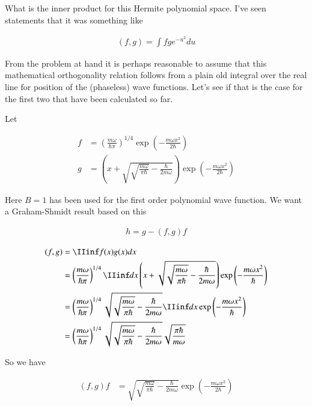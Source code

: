 What is the inner product for this Hermite polynomial space.  I've seen statements that it was something like

\begin{align*}
(f,g) = \int f g e^{-u^2} du
\end{align*}

From the problem at hand it is perhaps reasonable to assume that this 
mathematical orthogonality relation follows from a plain old integral over
the real line for position of the (phaseless) wave functions.  Let's see
if that is the case for the first two that have been calculated so far.

Let

\begin{align*}
f &= 
\left( 
\frac{ m \omega }{\hbar \pi}
\right)^{1/4} \exp\left( - \frac{m \omega x^2 }{2 \hbar} \right) \\
g &=
\left(x + \sqrt{\sqrt{\frac{m \omega}{\pi \hbar}} - \frac{ \hbar}{ 2 m \omega} }\right) \exp\left( - \frac{m \omega x^2}{2 \hbar} \right)
\end{align*}

Here $B=1$ has been used for the first order polynomial wave function.  We want a Graham-Shmidt result based on this

\begin{align*}
h = g - (f,g) f
\end{align*}

\begin{align*}
(f,g)
&= \IIinf f(x) g(x) dx \\
&= 
\left( 
\frac{ m \omega }{\hbar \pi}
\right)^{1/4} 
\IIinf dx
\left(x + \sqrt{\sqrt{\frac{m \omega}{\pi \hbar}} - \frac{ \hbar}{ 2 m \omega} }\right) 
\exp\left( - \frac{m \omega x^2 }{\hbar} \right) \\
&= 
\left( 
\frac{ m \omega }{\hbar \pi}
\right)^{1/4} 
\sqrt{\sqrt{\frac{m \omega}{\pi \hbar}} - \frac{ \hbar}{ 2 m \omega} }
\IIinf dx
\exp\left( - \frac{m \omega x^2 }{\hbar} \right) \\
&= 
\left( 
\frac{ m \omega }{\hbar \pi}
\right)^{1/4} 
\sqrt{\sqrt{\frac{m \omega}{\pi \hbar}} - \frac{ \hbar}{ 2 m \omega} }
\sqrt{ \frac{\pi \hbar}{ m \omega} }
\end{align*}

So we have

\begin{align*}
(f,g) f 
&= 
\sqrt{\sqrt{\frac{m \omega}{\pi \hbar}} - \frac{ \hbar}{ 2 m \omega} }
\exp\left( - \frac{m \omega x^2 }{2 \hbar} \right) \\
\end{align*}

